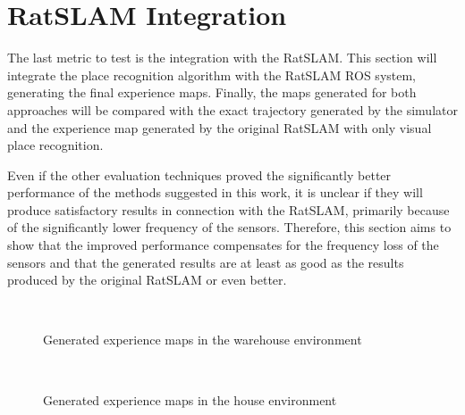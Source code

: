 \section{RatSLAM Integration}\label{section:RatSalmIntegration}

The last metric to test is the integration with the RatSLAM. This section will integrate the place recognition algorithm with the RatSLAM ROS system, generating the final experience maps. Finally, the maps generated for both approaches will be compared with the exact trajectory generated by the simulator and the experience map generated by the original RatSLAM with only visual place recognition.\par
Even if the other evaluation techniques proved the significantly better performance of the methods suggested in this work, it is unclear if they will produce satisfactory results in connection with the RatSLAM, primarily because of the significantly lower frequency of the sensors. Therefore, this section aims to show that the improved performance compensates for the frequency loss of the sensors and that the generated results are at least as good as the results produced by the original RatSLAM or even better.\par

\begin{figure}[!tbp]
    \centering
    \hfill
    \\
    \hfill
    \caption{Generated experience maps in the warehouse environment}
    \label{fig:mapsWarehouse}
\end{figure}

\begin{figure}[!tbp]
    \centering
    \hfill
    \\
    \hfill
    \caption{Generated experience maps in the house environment}
    \label{fig:mapsHouse}
\end{figure}

